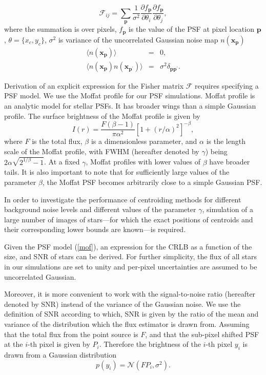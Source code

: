 \documentclass[12pt, preprint]{aastex}
\newcommand{\beq}{\begin{equation}}
\newcommand{\eeq}{\end{equation}}
\begin{document}
\beq
  \mathcal{F}_{ij} = \sum_{\mathbf{p}}\frac{1}{\sigma^{2}}
                \frac{\partial f_{\mathbf{p}}}{\partial \theta_{i}}\frac{\partial f_{\mathbf{p}}}{\partial \theta_{j}},
\label{fish}
\eeq
where the summation is over pixels, $f_{\mathbf{p}}$ is the value of the PSF at pixel location $\mathbf{p}$,
$\theta=\{x_{c},y_{c}\}$, $\sigma^{2}$ is variance of the uncorrelated Gaussian noise map $n(\mathbf{x_{p}})$
\begin{eqnarray}
\langle n(\mathbf{x_{p}}) \rangle &=& 0, \\
\langle n(\mathbf{x_{p}})n(\mathbf{x_{p^{\prime}}}) \rangle &=& \sigma^{2}\delta_{\mathbf{p}\mathbf{p}^{\prime}}. 
\end{eqnarray}

Derivation of an explicit expression for the Fisher matrix $\mathcal{F}$ requires specifying a PSF model.
We use the Moffat profile \citep{moffat} for our PSF simulations. 
Moffat profile is an analytic model for stellar PSFs. It has broader wings than
a simple Gaussian profile. The surface brightness of the Moffat profile is given by
\beq
I(r) = \frac{F(\beta -1)}{\pi \alpha^{2}}[1+(r/\alpha)^{2}]^{-\beta},
\label{mof}
\eeq
where $F$ is the total flux, $\beta$ is a dimensionless parameter, and $\alpha$ is
the length scale of the Moffat profile, with FWHM (hereafter denoted by $\gamma$)
being $2\alpha\sqrt{2^{1/\beta}-1}$. At a fixed $\gamma$, Moffat profiles with lower values
of $\beta$ have broader tails. It is also important to note that for sufficiently large values of the 
parameter $\beta$, the Moffat PSF becomes arbitrarily close to a simple Gaussian PSF. 
 
In order to investigate the performance of centroiding methods for
 different background noise levels and different
values of the parameter $\gamma$, simulation of a large number of images of stars---for which the exact positions of centroids
and their corresponding lower bounds are known---is required.

Given the PSF model (\ref{mof}), an expression for the CRLB as a function of the size, and SNR of stars can be 
derived. For further simplicity, the flux of all stars in our simulations are set to unity and per-pixel 
uncertainties are assumed to be uncorrelated Gaussian.

Moreover, it is more convenient to work with the signal-to-noise ratio
(hereafter denoted by SNR) instead of the variance of the Gaussian noise.
We use the definition of SNR according to which, SNR is given by the ratio
 of the mean and variance of the distribution
which the flux estimator is drawn from. Assuming that the total flux from
the point source is $F$, and that the sub-pixel shifted PSF at the $i$-th pixel is given
by $P_{i}$. Therefore the brightness of the $i$-th pixel $y_{i}$ is drawn from
a Gaussian distribution 
\beq
p(y_{i}) = \mathcal{N}(FP_{i},\sigma^{2}). 
\eeq
\end{document}
